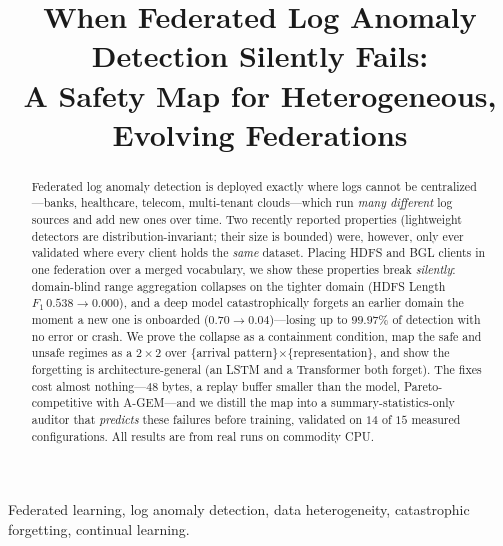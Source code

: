 \documentclass[conference]{IEEEtran}
\begin{document}
\title{When Federated Log Anomaly Detection Silently Fails:\\
A Safety Map for Heterogeneous, Evolving Federations}

\author{
}

\maketitle

\begin{abstract}
Federated log anomaly detection is deployed exactly where logs cannot be centralized---banks,
healthcare, telecom, multi-tenant clouds---which run \emph{many different} log sources and add new
ones over time. Two recently reported properties (lightweight detectors are distribution-invariant;
their size is bounded) were, however, only ever validated where every client holds the \emph{same}
dataset. Placing HDFS and BGL clients in one federation over a merged vocabulary, we show these
properties break \emph{silently}: domain-blind range aggregation collapses on the tighter domain
(HDFS Length $F_1\,0.538\!\rightarrow\!0.000$), and a deep model catastrophically forgets an earlier
domain the moment a new one is onboarded ($0.70\!\rightarrow\!0.04$)---losing up to $99.97\%$ of
detection with no error or crash. We prove the collapse as a containment condition, map the safe and
unsafe regimes as a $2\times2$ over \{arrival pattern\}$\times$\{representation\}, and show the
forgetting is architecture-general (an LSTM and a Transformer both forget). The fixes cost almost
nothing---$48$ bytes, a replay buffer smaller than the model, Pareto-competitive with A-GEM---and we
distill the map into a summary-statistics-only auditor that \emph{predicts} these failures before
training, validated on $14$ of $15$ measured configurations. All results are from real runs on
commodity CPU.
\end{abstract}

\begin{IEEEkeywords}
Federated learning, log anomaly detection, data heterogeneity, catastrophic forgetting, continual learning.
\end{IEEEkeywords}
\end{document}
